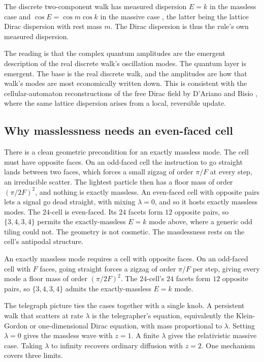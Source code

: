 \begin{result}
The discrete two-component walk has measured dispersion $E = k$ in the massless case and
$\cos E = \cos m \cos k$ in the massive case \cite{pollard2026vibetest}, the latter being the lattice Dirac
dispersion with rest mass $m$. The Dirac dispersion is thus the rule's own measured dispersion.
\end{result}

The reading is that the complex quantum amplitudes are the emergent description of the real discrete walk's
oscillation modes. The quantum layer is emergent. The base is the real discrete walk, and the amplitudes are how
that walk's modes are most economically written down. This is consistent with the cellular-automaton
reconstructions of the free Dirac field by D'Ariano and Bisio \cite{dariano2014, bisio2015}, where the same
lattice dispersion arises from a local, reversible update.

\subsection{Why masslessness needs an even-faced cell}

There is a clean geometric precondition for an exactly massless mode. The cell must have opposite faces. On an
odd-faced cell the instruction to go straight lands between two faces, which forces a small zigzag of order
$\pi/F$ at every step, an irreducible scatter. The lightest particle then has a floor mass of order
$(\pi/2F)^2$, and nothing is exactly massless. An even-faced cell with opposite pairs lets a signal go dead
straight, with mixing $\lambda = 0$, and so it hosts exactly massless modes. The $24$-cell is even-faced. Its
$24$ facets form $12$ opposite pairs, so $\{3,4,3,4\}$ permits the exactly-massless $E = k$ mode above, where a
generic odd tiling could not. The geometry is not cosmetic. The masslessness rests on the cell's antipodal
structure.

\begin{proposition}
An exactly massless mode requires a cell with opposite faces. On an odd-faced cell with $F$ faces, going straight
forces a zigzag of order $\pi/F$ per step, giving every mode a floor mass of order $(\pi/2F)^2$. The $24$-cell's
$24$ facets form $12$ opposite pairs, so $\{3,4,3,4\}$ admits the exactly-massless $E = k$ mode.
\end{proposition}

The telegraph picture ties the cases together with a single knob. A persistent walk that scatters at rate
$\lambda$ is the telegrapher's equation, equivalently the Klein-Gordon or one-dimensional Dirac equation, with
mass proportional to $\lambda$. Setting $\lambda = 0$ gives the massless wave with $z = 1$. A finite $\lambda$
gives the relativistic massive case. Taking $\lambda$ to infinity recovers ordinary diffusion with $z = 2$. One
mechanism covers three limits.


